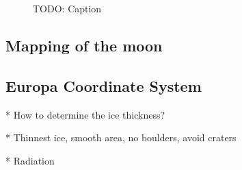 \begin{figure}[htb]
	\centering
	\caption{TODO: Caption}
	\label{fig:PIA01642}
\end{figure}

\subsection{Mapping of the moon}

\subsection{Europa Coordinate System}

* How to determine the ice thickness?

* Thinnest ice, smooth area, no boulders, avoid craters

* Radiation

